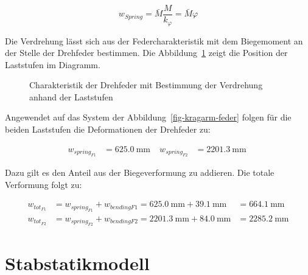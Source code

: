 \documentclass[
  10pt,
  letterpaper,
]{scrreprt}
\begin{document}
\[
w_{Spring} = \bar{M} \frac{M}{k_\varphi} = \bar{M} \varphi
\]

Die Verdrehung lässt sich aus der Federcharakteristik mit dem
Biegemoment an der Stelle der Drehfeder bestimmen. Die
Abbildung~\ref{fig-feder-force} zeigt die Position der Laststufen im
Diagramm.

\begin{figure}[H]


\caption{\label{fig-feder-force}Charakteristik der Drehfeder mit
Bestimmung der Verdrehung anhand der Laststufen}

\end{figure}%

Angewendet auf das System der Abbildung~\ref{fig-kragarm-feder} folgen
für die beiden Laststufen die Deformationen der Drehfeder zu:

$$
\begin{aligned}
w_{spring_{F1}} &= 625.0\ \mathrm{mm} \; 
 &w_{spring_{F2}} &= 2201.3\ \mathrm{mm} \;
\end{aligned}
$$

Dazu gilt es den Anteil aus der Biegeverformung zu addieren. Die totale
Verformung folgt zu:

$$
\begin{aligned}
w_{tot_{F1}} &= w_{spring_{F1}} + w_{bendingF1}  = 625.0\ \mathrm{mm} + 39.1\ \mathrm{mm} &= 664.1\ \mathrm{mm}  
\\[12pt]
w_{tot_{F2}} &= w_{spring_{F2}} + w_{bendingF2}  = 2201.3\ \mathrm{mm} + 84.0\ \mathrm{mm} &= 2285.2\ \mathrm{mm}  
\end{aligned}
$$

\section{Stabstatikmodell}\label{stabstatikmodell}
\end{document}
